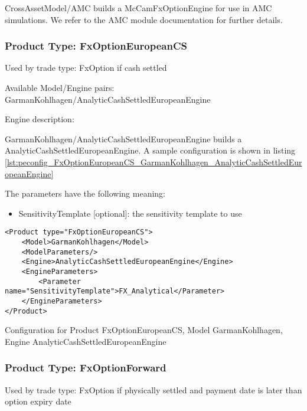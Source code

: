 CrossAssetModel/AMC builds a McCamFxOptionEngine for use in AMC simulations. We refer to the AMC module documentation
for further details.

\subsubsection{Product Type: FxOptionEuropeanCS}

Used by trade type: FxOption if cash settled

Available Model/Engine pairs: GarmanKohlhagen/AnalyticCashSettledEuropeanEngine

Engine description:

GarmanKohlhagen/AnalyticCashSettledEuropeanEngine builds a AnalyticCashSettledEuropeanEngine. A sample configuration is shown in listing
\ref{lst:peconfig_FxOptionEuropeanCS_GarmanKohlhagen_AnalyticCashSettledEuropeanEngine}

The parameters have the following meaning:

\begin{itemize}
\item SensitivityTemplate [optional]: the sensitivity template to use 
\end{itemize}

\begin{longlisting}
\begin{verbatim}
<Product type="FxOptionEuropeanCS">
    <Model>GarmanKohlhagen</Model>
    <ModelParameters/>
    <Engine>AnalyticCashSettledEuropeanEngine</Engine>
    <EngineParameters>
        <Parameter name="SensitivityTemplate">FX_Analytical</Parameter>
    </EngineParameters>
</Product>
\end{verbatim}
\caption{Configuration for Product FxOptionEuropeanCS, Model GarmanKohlhagen, Engine AnalyticCashSettledEuropeanEngine}
\label{lst:peconfig_FxOptionEuropeanCS_GarmanKohlhagen_AnalyticCashSettledEuropeanEngine}
\end{longlisting}

\subsubsection{Product Type: FxOptionForward}

Used by trade type: FxOption if physically settled and payment date is later than option expiry date

